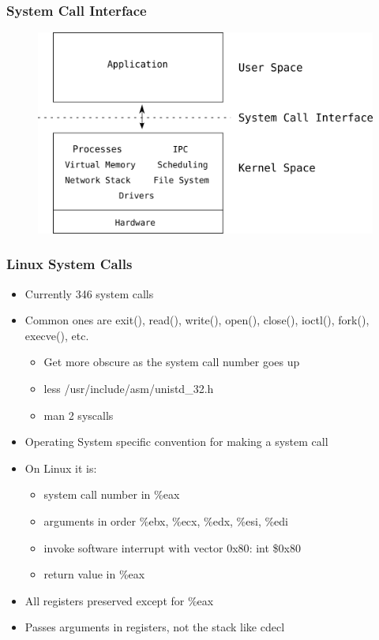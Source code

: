 \documentclass[11pt,xcolor=dvipsnames]{beamer}
\newcommand{\mvs}{\vspace{-0.95em}}
\begin{document}
\begin{frame}[fragile,t]
\frametitle{System Call Interface}
\begin{figure}
\centering
\includegraphics[height=0.65\paperheight]{figures/monolithic.png}
\end{figure}
\end{frame}


\begin{frame}[fragile,t]
\frametitle{Linux System Calls}
\mvs
\begin{itemize}
  \item Currently 346 system calls
  \item Common ones are {\ttfamily exit(), read(), write(), open(), close(), ioctl(), fork(), execve()}, etc.
  \pause
  \begin{itemize}
  \item Get more obscure as the system call number goes up
  \item {\ttfamily less /usr/include/asm/unistd\_32.h}
  \item {\ttfamily man 2 syscalls}
  \end{itemize}
  \pause
  \item Operating System specific convention for making a system call
  \pause
  \item On Linux it is:
  \begin{itemize}
    \item system call number in {\ttfamily \%eax}
    \item arguments in order {\ttfamily \%ebx, \%ecx, \%edx, \%esi, \%edi}
    \item invoke software interrupt with vector {\ttfamily 0x80}: {\ttfamily int \$0x80}
    \item return value in \%eax
  \end{itemize}
  \pause
  \item All registers preserved except for {\ttfamily \%eax}
  \item Passes arguments in registers, not the stack like {\ttfamily cdecl}
\end{itemize}
\end{frame}
\end{document}
